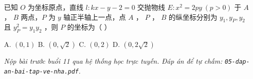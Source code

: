 \documentclass[11pt, a4paper]{article}
\begin{document}
\begin{baitap}[15]
已知 $O$ 为坐标原点，直线 $l: kx - y - 2 = 0$ 交抛物线 $E: x^2 = 2py \ (p > 0)$ 于 $A$ ， $B$ 两点，$P$ 为 $y$ 轴正半轴上一点，点 $A$ ， $P$ ， $B$ 的纵坐标分别为 $y_1, y_P, y_2$ 且 $y_P^2 = y_1 y_2$ ，则 $P$ 的坐标为（ ）
\par\vspace{3pt}
\noindent A. $(0, 1)$ \quad B. $(0, \sqrt{2})$ \quad C. $(0, 2)$ \quad D. $(0, 2\sqrt{2})$
\end{baitap}

\vspace{0.3cm}
\noindent\emph{Nộp bài trước buổi 11 qua hệ thống học trực tuyến. Đáp án để tự chấm: \texttt{05-dap-an-bai-tap-ve-nha.pdf}.}
\end{document}
